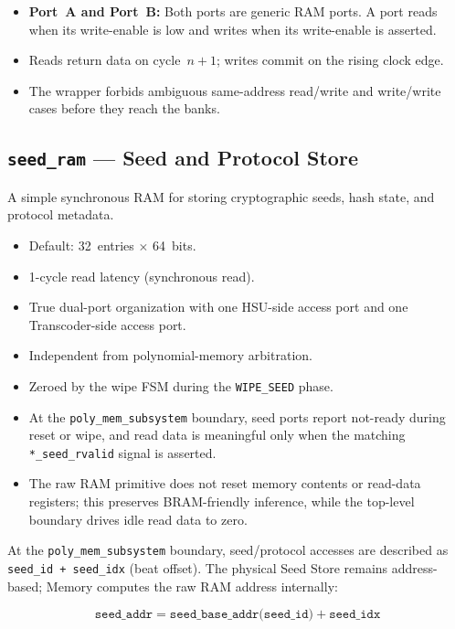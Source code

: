 \documentclass[11pt,letterpaper]{article}
\begin{document}
\begin{itemize}
  \item \textbf{Port~A and Port~B:} Both ports are generic RAM ports.
    A port reads when its write-enable is low and writes when its
    write-enable is asserted.
  \item Reads return data on cycle~$n{+}1$; writes commit on the rising
    clock edge.
  \item The wrapper forbids ambiguous same-address read/write and
    write/write cases before they reach the banks.
\end{itemize}

\subsection{\texttt{seed\_ram} --- Seed and Protocol Store}

A simple synchronous RAM for storing cryptographic seeds, hash state,
and protocol metadata.

\begin{itemize}
  \item Default: 32~entries $\times$ 64~bits.
  \item 1-cycle read latency (synchronous read).
  \item True dual-port organization with one HSU-side access port and one
    Transcoder-side access port.
  \item Independent from polynomial-memory arbitration.
  \item Zeroed by the wipe FSM during the \texttt{WIPE\_SEED} phase.
  \item At the \texttt{poly\_mem\_subsystem} boundary, seed ports report
    not-ready during reset or wipe, and read data is meaningful only when the
    matching \texttt{*\_seed\_rvalid} signal is asserted.
  \item The raw RAM primitive does not reset memory contents or read-data
    registers; this preserves BRAM-friendly inference, while the top-level
    boundary drives idle read data to zero.
\end{itemize}

At the \texttt{poly\_mem\_subsystem} boundary, seed/protocol accesses are
described as \texttt{seed\_id + seed\_idx} (beat offset). The physical Seed
Store remains address-based; Memory computes the raw RAM address internally:

\begin{equation}
  \texttt{seed\_addr} = \texttt{seed\_base\_addr(seed\_id)} + \texttt{seed\_idx}
\end{equation}
\end{document}
